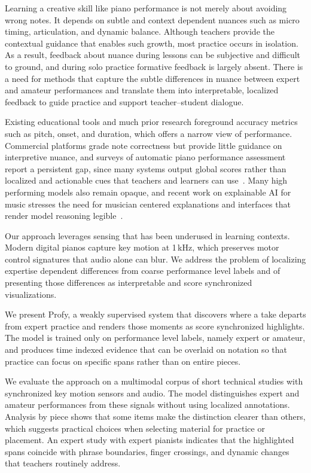 \documentclass[sigconf,review,anonymous]{acmart}
\begin{document}
Learning a creative skill like piano performance is not merely about avoiding wrong notes. It depends on subtle and context dependent nuances such as micro timing, articulation, and dynamic balance. Although teachers provide the contextual guidance that enables such growth, most practice occurs in isolation. As a result, feedback about nuance during lessons can be subjective and difficult to ground, and during solo practice formative feedback is largely absent. There is a need for methods that capture the subtle differences in nuance between expert and amateur performances and translate them into interpretable, localized feedback to guide practice and support teacher–student dialogue.

Existing educational tools and much prior research foreground accuracy metrics such as pitch, onset, and duration, which offers a narrow view of performance. Commercial platforms grade note correctness but provide little guidance on interpretive nuance, and surveys of automatic piano performance assessment report a persistent gap, since many systems output global scores rather than localized and actionable cues that teachers and learners can use~\cite{Kim2022APPA}. Many high performing models also remain opaque, and recent work on explainable AI for music stresses the need for musician centered explanations and interfaces that render model reasoning legible~\cite{BryanKinns2024}.

Our approach leverages sensing that has been underused in learning contexts. Modern digital pianos capture key motion at 1\,kHz, which preserves motor control signatures that audio alone can blur. We address the problem of localizing expertise dependent differences from coarse performance level labels and of presenting those differences as interpretable and score synchronized visualizations.

We present Profy, a weakly supervised system that discovers where a take departs from expert practice and renders those moments as score synchronized highlights. The model is trained only on performance level labels, namely expert or amateur, and produces time indexed evidence that can be overlaid on notation so that practice can focus on specific spans rather than on entire pieces.

We evaluate the approach on a multimodal corpus of short technical studies with synchronized key motion sensors and audio. The model distinguishes expert and amateur performances from these signals without using localized annotations. Analysis by piece shows that some items make the distinction clearer than others, which suggests practical choices when selecting material for practice or placement. An expert study with expert pianists indicates that the highlighted spans coincide with phrase boundaries, finger crossings, and dynamic changes that teachers routinely address.
\end{document}
